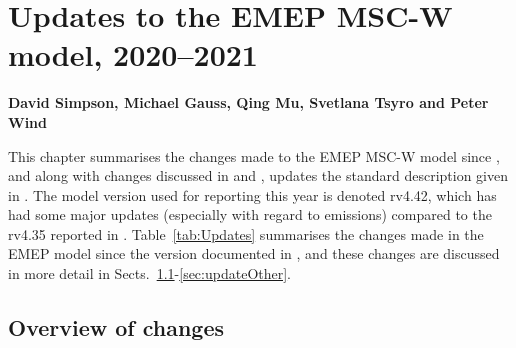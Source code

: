 \chapter[Model updates]{Updates to the EMEP MSC-W model, 2020--2021}
\label{ch:ModelUpdates}


{\bf{David Simpson, Michael Gauss, Qing Mu, Svetlana Tsyro and Peter Wind}}
\vspace{30pt}


This chapter summarises the changes made to the EMEP MSC-W  model
since \citet{R2020:ModDev}, and along with changes discussed in
\citet{R2013:ModDev,R2015:ModDev,R2016:ModDev,R2017:ModDev,R2019:ModDev,R2020:ModDev} and
\citet{R2014:ModDev},
updates the standard description given in \citet{Simpson_et_al:EMEP}. The
model version used for reporting this year is denoted rv4.42, which has
had some major updates (especially with regard to emissions) compared to
the rv4.35 reported in \citet{R2020:ModDev}.
Table~\ref{tab:Updates} summarises
the changes made in the EMEP model since the version documented in
\citet{Simpson_et_al:EMEP}, and these changes are discussed in
more detail in Sects.~\ref{sec:updateOverview}-\ref{sec:updateOther}.

%

\section{Overview of changes} 
\label{sec:updateOverview}

